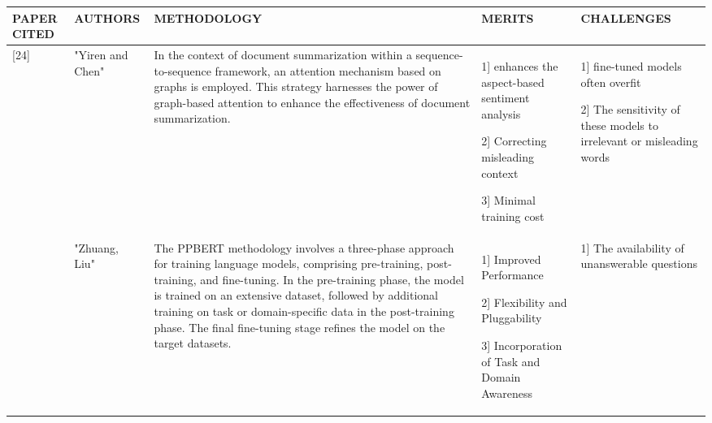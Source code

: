 \documentclass[conference]{IEEEtran}
\begin{document}
\begin{table}
\begin{center}
 \centering
    \begin{tabular}{ |p{1cm}|p{2cm}|p{4cm}|p{4cm}|p{4cm}| }
\hline
\centering PAPER CITED & \centering  AUTHORS & \centering METHODOLOGY &  \centering MERITS &  \centering CHALLENGES \arraybackslash \\ 
\hline

[24]  & "Yiren and Chen" & In the context of document summarization within a sequence-to-sequence framework, an attention mechanism based on graphs is employed. This strategy harnesses the power of graph-based attention to enhance the effectiveness of document summarization. & 1] enhances the aspect-based sentiment analysis

2] Correcting misleading context

3] Minimal training cost  & 1] fine-tuned models often overfit

2] The sensitivity of these models to irrelevant or misleading words
\\
\hline
[25] & "Zhuang, Liu" & The PPBERT methodology involves a three-phase approach for training language models, comprising pre-training, post-training, and fine-tuning. In the pre-training phase, the model is trained on an extensive dataset, followed by additional training on task or domain-specific data in the post-training phase. The final fine-tuning stage refines the model on the target datasets. &  1] Improved Performance

2] Flexibility and Pluggability

3] Incorporation of Task and Domain Awareness & 1] The availability of unanswerable questions


\end{tabular}
\end{center}
\end{table}
\end{document}
